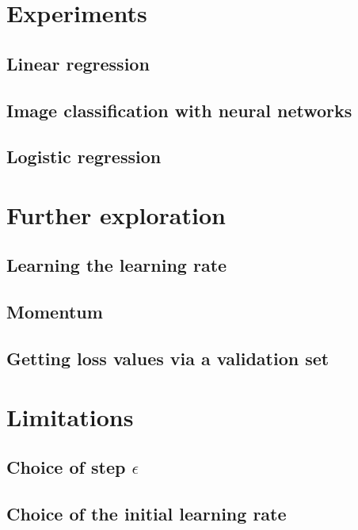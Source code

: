 \documentclass{article}
\begin{document}
  \section{Experiments}
  
  \subsection{Linear regression}
  
  \subsection{Image classification with neural networks}
  
  \subsection{Logistic regression}
  
  \section{Further exploration}
  
  \subsection{Learning the learning rate}
  
  \subsection{Momentum}
  
  \subsection{Getting loss values via a validation set}
  
  \section{Limitations}
  
  \subsection{Choice of step $\epsilon$}
  
  \subsection{Choice of the initial learning rate}
  
\end{document}
